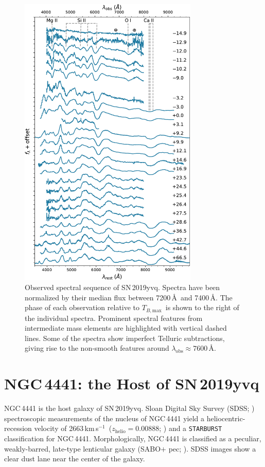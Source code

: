 \documentclass[twocolumn]{aastex63}
\newcommand{\tbmax}{$T_{B,\mathrm{max}}$}
\newcommand{\kms}{km\,s$^{-1}$}
\newcommand{\sn}{SN\,2019yvq}
\begin{document}


\begin{figure}
    \centering
    \includegraphics[width=3.35in]{./figures/spec_evo.pdf}
    \caption{Observed spectral sequence of \sn. Spectra have been normalized
    by their median flux between 7200\,\AA\ and 7400\,\AA. The phase of each
    observation relative to \tbmax\ is shown to the right of the individual
    spectra. Prominent spectral features from intermediate mass elements are
    highlighted with vertical dashed lines. Some of the spectra show
    imperfect Telluric subtractions, giving rise to the non-smooth features
    around $\lambda_\mathrm{obs} \approx 7600$\,\AA.}
    \label{fig:spec_evo}
\end{figure}

\section{NGC\,4441: the Host of \sn}\label{sec:host}

NGC\,4441 is the host galaxy of \sn. Sloan Digital Sky Survey (SDSS;
\citealt{York00}) spectroscopic measurements of the nucleus of NGC\,4441
yield a heliocentric-recession velocity of 2663\,\kms\ ($z_\mathrm{helio} =
0.00888$; \citealt{Abolfathi18}) and a \texttt{STARBURST} classification for
NGC\,4441. Morphologically, NGC\,4441 is classified as a peculiar,
weakly-barred, late-type lenticular galaxy (SABO$+$ pec;
\citealt{de-Vaucouleurs91}). SDSS images show a clear dust lane near the
center of the galaxy.
\end{document}
